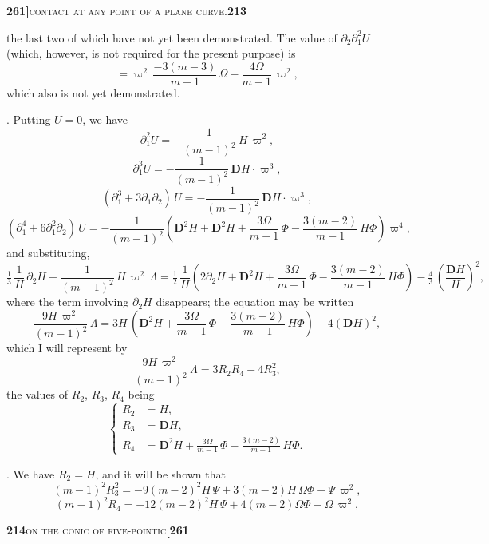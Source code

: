 \documentclass[11pt]{article}
\begin{document}
\newpage

\noindent\textbf{261]}\hfill\textsc{contact at any point of a plane curve.}\hfill\textbf{213}

\medskip

\noindent the last two of which have not yet been demonstrated. The value of $\partial_2 \partial_1^2 U$ (which, however, is not required for the present purpose) is
\[
= \varpi^2\,\frac{-3(m-3)}{m-1}\,\Omega - \frac{4\Omega}{m-1}\,\varpi^2,
\]
which also is not yet demonstrated.

\medskip

. Putting $U = 0$, we have
\[
\partial_1^2 U = -\frac{1}{(m-1)^2}\,H\,\varpi^2,
\]
\[
\partial_1^3 U = -\frac{1}{(m-1)^2}\,\mathbf{D}H \cdot \varpi^3,
\]
\[
(\partial_1^3 + 3\partial_1\partial_2)\,U = -\frac{1}{(m-1)^2}\,\mathbf{D}H \cdot \varpi^3,
\]
\[
(\partial_1^4 + 6\partial_1^2\partial_2)\,U = -\frac{1}{(m-1)^2}\!\left(\mathbf{D}^2 H + \mathbf{D}^2 H + \frac{3\Omega}{m-1}\,\Phi - \frac{3(m-2)}{m-1}\,H\Phi\right)\varpi^4,
\]
and substituting,
\[
\tfrac{1}{3}\,\frac{1}{H}\,\partial_2 H + \frac{1}{(m-1)^2}\,H\,\varpi^2\,\Lambda
   = \tfrac{1}{2}\,\frac{1}{H}\!\left(2\partial_2 H + \mathbf{D}^2 H + \frac{3\Omega}{m-1}\,\Phi - \frac{3(m-2)}{m-1}\,H\Phi\right)
   - \tfrac{4}{3}\,\left(\frac{\mathbf{D}H}{H}\right)^{\!2},
\]
where the term involving $\partial_2 H$ disappears; the equation may be written
\[
\frac{9 H\,\varpi^2}{(m-1)^2}\,\Lambda = 3H\,\!\left(\mathbf{D}^2 H + \frac{3\Omega}{m-1}\,\Phi - \frac{3(m-2)}{m-1}\,H\Phi\right) - 4(\mathbf{D}H)^2,
\]
which I will represent by
\[
\frac{9 H\,\varpi^2}{(m-1)^2}\,\Lambda = 3R_2 R_4 - 4R_3^2,
\]
the values of $R_2$, $R_3$, $R_4$ being
\[
\left\{
\begin{aligned}
R_2 &= H,\\
R_3 &= \mathbf{D}H,\\
R_4 &= \mathbf{D}^2 H + \frac{3\Omega}{m-1}\,\Phi - \frac{3(m-2)}{m-1}\,H\Phi.
\end{aligned}
\right.
\]

\medskip

. We have $R_2 = H$, and it will be shown that
\[
(m-1)^2 R_3^2 = -9(m-2)^2 H\,\Psi
   + 3(m-2)H\,\Omega\Phi - \Psi\,\varpi^2,
\]
\[
(m-1)^2 R_4 = -12(m-2)^2 H\,\Psi
   + 4(m-2)\Omega\Phi
   - \Omega\,\varpi^2,
\]

\newpage

\noindent\textbf{214}\hfill\textsc{on the conic of five-pointic}\hfill\textbf{[261}

\medskip
\end{document}
